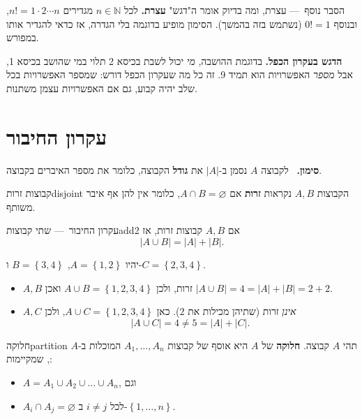 \documentclass[11pt,a4paper]{report}
\newenvironment{notation}{\par\smallskip\noindent\textsf{\textbf{סימון.}}\ }{\par\smallskip}
\newcommand{\N}{\mathbb{N}}
\newcommand{\set}[1]{\left\{#1\right\}}
\renewcommand{\emptyset}{\varnothing}
\newcommand{\dash}{{\rmfamily —}}
\begin{document}
\begin{suggestion}{הסבר נוסף~\dash{} עצרת, ומה בדיוק אומר ה"דגש"}
\textbf{עצרת.} לכל $n\in\N$ מגדירים $n!=1\cdot2\cdots n$, ובנוסף $0!=1$ (נשתמש בזה בהמשך). הסימון מופיע בדוגמה בלי הגדרה, אז כדאי להגדיר אותו במפורש.

\textbf{הדגש בעקרון הכפל.} בדוגמת ההושבה, \emph{מי} יכול לשבת בכיסא 2 תלוי במי שהושב בכיסא 1, אבל \emph{מספר} האפשרויות הוא תמיד 9. זה כל מה שעקרון הכפל דורש: שמספר האפשרויות בכל שלב יהיה קבוע, גם אם האפשרויות עצמן משתנות.
\end{suggestion}

\section{עקרון החיבור}

\begin{notation}
לקבוצה $A$ נסמן ב-$|A|$ את \textbf{גודל} הקבוצה, כלומר את מספר האיברים בקבוצה.
\end{notation}

\begin{definition}{קבוצות זרות}{disjoint}
הקבוצות $A,B$ נקראות \textbf{זרות} אם $A\cap B=\emptyset$, כלומר אין להן אף איבר משותף.
\end{definition}

\begin{principle}{עקרון החיבור~\dash{} שתי קבוצות}{add2}
אם $A,B$ קבוצות זרות, אז
\[
  |A\cup B|=|A|+|B|.
\]
\end{principle}

\begin{example}{}{}
יהיו $A=\set{1,2}$, $B=\set{3,4}$ ו-$C=\set{2,3,4}$.
\begin{itemize}
  \item $A,B$ זרות, ולכן $A\cup B=\set{1,2,3,4}$ ואכן $|A\cup B|=4=|A|+|B|=2+2$.
  \item $A,C$ \emph{אינן} זרות (שתיהן מכילות את $2$). כאן $A\cup C=\set{1,2,3,4}$, ולכן
  \[|A\cup C|=4\neq 5=|A|+|C|.\]
\end{itemize}
\end{example}

\begin{definition}{חלוקה}{partition}
תהי $A$ קבוצה. \textbf{חלוקה} של $A$ היא אוסף של קבוצות $A_1,\dots,A_n$ המוכלות ב-$A$, שמקיימות:
\begin{itemize}
  \item $A=A_1\cup A_2\cup\dots\cup A_n$, וגם
  \item $A_i\cap A_j=\emptyset$ לכל $i\neq j$ ב-$\set{1,\dots,n}$.
\end{itemize}
\end{definition}
\end{document}
